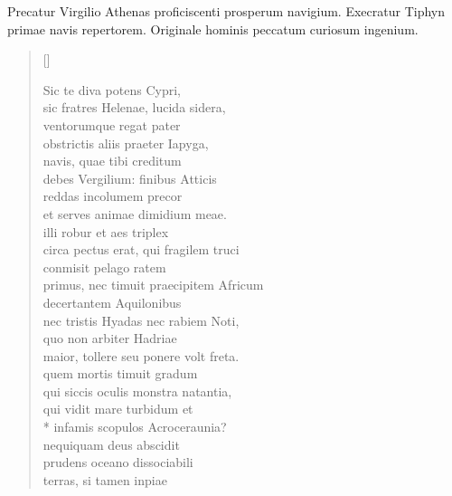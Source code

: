 
Precatur Virgilio Athenas proficiscenti prosperum navigium. Execratur
Tiphyn primae navis repertorem. Originale hominis peccatum curiosum
ingenium.






\settowidth{\versewidth}{sunt quos curriculo pulverem Olympicum}
\begin{verse}[\versewidth]
\begin{patverse*}
{\large
Sic te diva potens Cypri,\\
  sic fratres Helenae, lucida sidera, 	\\
ventorumque regat pater 	\\
  obstrictis aliis praeter Iapyga, 	\\
navis, quae tibi creditum\\
  debes Vergilium: finibus Atticis 	\\
reddas incolumem precor 	\\
  et serves animae dimidium meae. 	\\
illi robur et aes triplex 	\\
  circa pectus erat, qui fragilem truci\\
conmisit pelago ratem 	\\
  primus, nec timuit praecipitem Africum 	\\
decertantem Aquilonibus 	\\
  nec tristis Hyadas nec rabiem Noti, 	\\
quo non arbiter Hadriae\\
  maior, tollere seu ponere volt freta. 	\\
quem mortis timuit gradum 	\\
  qui siccis oculis monstra natantia, 	\\
qui vidit mare turbidum et 	\\*
  infamis scopulos Acroceraunia?\\
nequiquam deus abscidit 	\\
  prudens oceano dissociabili 	\\
terras, si tamen inpiae 	\\
}
\end{patverse*}
\end{verse}
